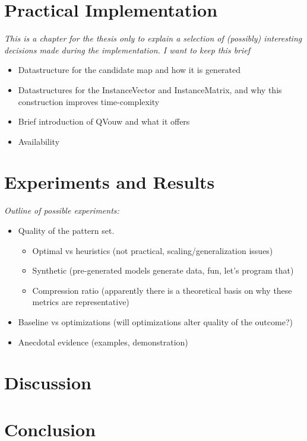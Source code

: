 \documentclass[a4paper,notoc,oneside]{tufte-book}
\begin{document}
\chapter{Practical Implementation}

\emph{This is a chapter for the thesis only to explain a selection of (possibly) interesting decisions made during the implementation. I want to keep this brief}
\begin{itemize}
\item Datastructure for the candidate map and how it is generated
\item Datastructures for the InstanceVector and InstanceMatrix, and why this construction improves time-complexity
\item Brief introduction of QVouw and what it offers
\item Availability
\end{itemize}

\chapter{Experiments and Results}

\emph{Outline of possible experiments:}
\begin{itemize}
\item Quality of the pattern set.
\begin{itemize}
\item Optimal vs heuristics (not practical, scaling/generalization issues)
\item Synthetic (pre-generated models generate data, fun, let's program that)
\item Compression ratio (apparently there is a theoretical basis on why these metrics are representative)
\end{itemize}
\item Baseline vs optimizations (will optimizations alter quality of the outcome?)
\item Anecdotal evidence (examples, demonstration)
\end{itemize}

\chapter{Discussion}

\chapter{Conclusion}
\end{document}

